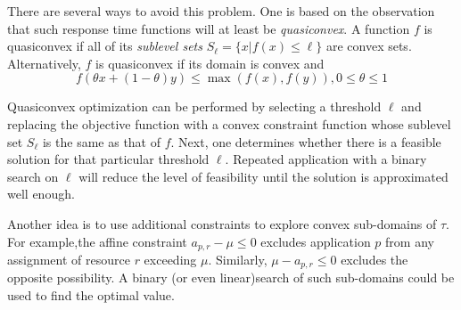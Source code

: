 There are several ways to avoid this problem.  One is based on the observation that such response time functions
will at least be \emph{quasiconvex}.  A function $f$ is quasiconvex if all of its \emph{sublevel sets}
$S_\ell = \{x | f(x) \leq \ell\}$ are convex sets.
Alternatively, $f$ is quasiconvex if its domain is convex and
\begin{displaymath}
f(\theta x + (1-\theta)y) \leq \max(f(x),f(y)), 0 \leq \theta \leq 1
\end{displaymath}

Quasiconvex optimization can be performed by selecting a threshold $\ell$ and replacing the objective function
with a convex constraint function whose sublevel set $S_\ell$ is the same as that of $f$.
Next, one determines whether there is a feasible solution for that particular threshold $\ell$.
Repeated application with a binary search on $\ell$ will reduce the level of feasibility
until the solution is approximated well enough.

Another idea is to use additional constraints to explore convex sub-domains of $\tau$.
For example,the affine constraint $a_{p,r} - \mu \leq 0$ excludes application $p$ from any assignment of resource $r$ exceeding $\mu$.  Similarly, $\mu - a_{p,r} \leq 0$ excludes the opposite possibility.
A binary (or even linear)search of such sub-domains could be used to find the optimal value.









